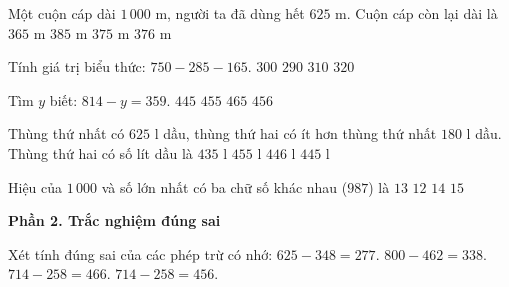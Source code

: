 \begin{ex} %
Một cuộn cáp dài $1\,000\text{ m}$, người ta đã dùng hết $625\text{ m}$. Cuộn cáp còn lại dài là
\choice
{$365\text{ m}$}
{$385\text{ m}$}
{\True $375\text{ m}$}
{$376\text{ m}$}
\end{ex}

\begin{ex} %
Tính giá trị biểu thức: $750 - 285 - 165$.
\choice
{\True $300$}
{$290$}
{$310$}
{$320$}
\end{ex}

\begin{ex} %
Tìm $y$ biết: $814 - y = 359$.
\choice
{$445$}
{\True $455$}
{$465$}
{$456$}
\end{ex}

\begin{ex} %
Thùng thứ nhất có $625\text{ l}$ dầu, thùng thứ hai có ít hơn thùng thứ nhất $180\text{ l}$ dầu. Thùng thứ hai có số lít dầu là
\choice
{$435\text{ l}$}
{$455\text{ l}$}
{$446\text{ l}$}
{\True $445\text{ l}$}
\end{ex}

\begin{ex} %
Hiệu của $1\,000$ và số lớn nhất có ba chữ số khác nhau ($987$) là
\choice
{\True $13$}
{$12$}
{$14$}
{$15$}
\end{ex}

\textbf{Phần 2. Trắc nghiệm đúng sai}

\begin{ex} %
Xét tính đúng sai của các phép trừ có nhớ:
\choiceTF
{\True $625 - 348 = 277$.}
{\True $800 - 462 = 338$.}
{$714 - 258 = 466$.}
{\True $714 - 258 = 456$.}
\end{ex}

